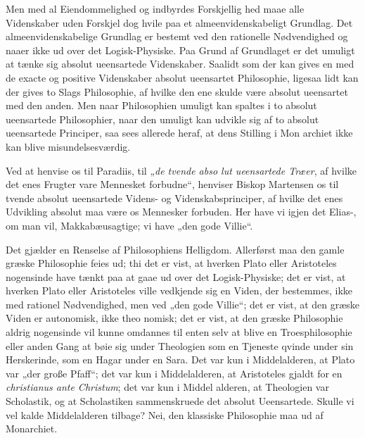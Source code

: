 \documentclass[12pt]{book}
\newcommand{\opage}[1]{\marginnote{\footnotesize\textit{[#1]}}}
\begin{document}
Men med al Eiendommelighed og indbyrdes Forskjellig\-%
hed maae alle Videnskaber uden Forskjel dog hvile paa et
almeenvidenskabeligt Grundlag. Det almeenvidenskabelige
Grundlag er bestemt ved den rationelle Nødvendighed og naaer
ikke ud over det Logisk-Physiske. Paa Grund af Grundlaget
er det umuligt at tænke sig absolut ueensartede Videnskaber.
Saalidt som der kan gives en med de exacte og positive
Videnskaber absolut ueensartet Philosophie, ligesaa lidt kan
der gives to Slags Philosophie, af hvilke den ene skulde være
absolut ueensartet med den anden. Men naar Philosophien
umuligt kan spaltes i to absolut ueensartede Philosophier,
naar den umuligt kan udvikle sig af to absolut ueensartede
Principer, saa sees allerede heraf, at dens Stilling i Mon\-%
archiet ikke kan blive misundelsesværdig.

Ved at henvise os til Paradiis, til „\emph{de tvende abso\-%
lut ueensartede Træer}, af hvilke det enes Frugter vare
Mennesket forbudne“, henviser Biskop Martensen os til
\opage{105}\setcounter{footnote}{0}%
tvende absolut ueensartede Videns- og Videnskabsprinciper,
af hvilke det enes Udvikling absolut maa være os Mennesker
forbuden. Her have vi igjen det Elias-, om man vil,
Makkabæusagtige; vi have „den gode Villie“.

Det gjælder en Renselse af Philosophiens Helligdom.
Allerførst maa den gamle græske Philosophie feies ud; thi det
er vist, at hverken Plato eller Aristoteles nogensinde have
tænkt paa at gaae ud over det Logisk-Physiske; det er vist,
at hverken Plato eller Aristoteles ville vedkjende sig en Viden,
der bestemmes, ikke med rationel Nødvendighed, men ved „den gode
Villie“; det er vist, at den græske Viden er autonomisk, ikke theo\-%
nomisk; det er vist, at den græske Philosophie aldrig nogensinde vil
kunne omdannes til enten selv at blive en Troesphilosophie eller
anden Gang at bøie sig under Theologien som en Tjeneste\-%
qvinde under sin Herskerinde, som en Hagar under en Sara.
Det var kun i Middelalderen, at Plato var „der große
Pfaff“; det var kun i Middelalderen, at Aristoteles gjaldt
for en \textit{christianus ante Christum}; det var kun i Middel\-%
alderen, at Theologien var Scholastik, og at Scholastiken
sammenskruede det absolut Ueensartede. Skulle vi vel kalde
Middelalderen tilbage? Nei, den klassiske Philosophie maa
ud af Monarchiet.
\end{document}
